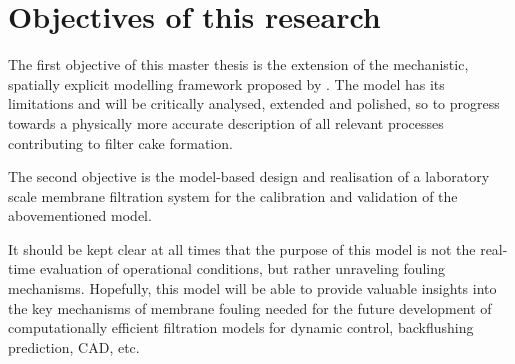 
\section{Objectives of this research}
The first objective of this master thesis is the extension of the mechanistic, spatially explicit modelling framework proposed by \cite{Ghijs2014}. The model has its limitations and will be critically analysed, extended and polished, so to progress towards a physically more accurate description of all relevant processes contributing to filter cake formation. \par
The second objective is the model-based design and realisation of a laboratory scale membrane filtration system for the calibration and validation of the abovementioned model. \par
It should be kept clear at all times that the purpose of this model is not the real-time evaluation of operational conditions, but rather unraveling fouling mechanisms. Hopefully, this model will be able to provide valuable insights into the key mechanisms of membrane fouling needed for the future development of computationally efficient filtration models for dynamic control, backflushing prediction, \gls{CAD}, etc. 


